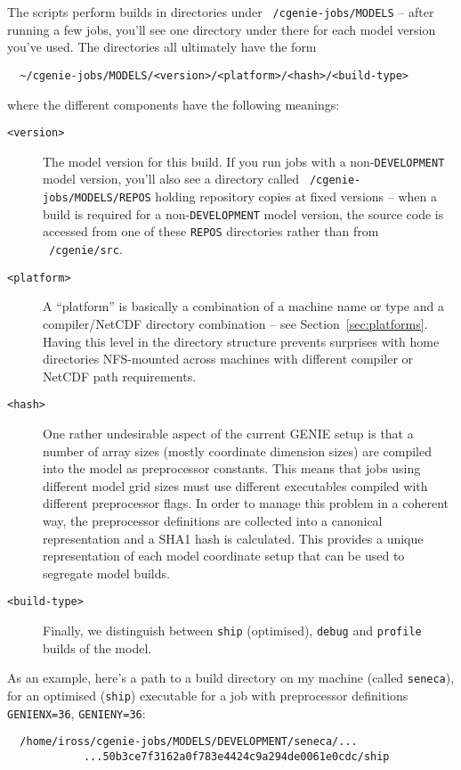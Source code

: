 \documentclass[a4paper,10pt,article]{memoir}
\begin{document}
The scripts perform builds in directories under
\texttt{~/cgenie-jobs/MODELS} -- after running a few jobs, you'll see
one directory under there for each model version you've used.  The
directories all ultimately have the form
\begin{verbatim}
  ~/cgenie-jobs/MODELS/<version>/<platform>/<hash>/<build-type>
\end{verbatim}
where the different components have the following meanings:
\begin{description}
  \item[\texttt{<version>}]{The model version for this build.  If you
    run jobs with a non-\texttt{DEVELOPMENT} model version, you'll
    also see a directory called \texttt{~/cgenie-jobs/MODELS/REPOS}
    holding repository copies at fixed versions -- when a build is
    required for a non-\texttt{DEVELOPMENT} model version, the source
    code is accessed from one of these \texttt{REPOS} directories
    rather than from \texttt{~/cgenie/src}.}
  \item[\texttt{<platform>}]{A ``platform'' is basically a combination
    of a machine name or type and a compiler/NetCDF directory
    combination -- see Section~\ref{sec:platforms}.  Having this level
    in the directory structure prevents surprises with home
    directories NFS-mounted across machines with different compiler or
    NetCDF path requirements.}
  \item[\texttt{<hash>}]{One rather undesirable aspect of the current
    GENIE setup is that a number of array sizes (mostly coordinate
    dimension sizes) are compiled into the model as preprocessor
    constants.  This means that jobs using different model grid sizes
    must use different executables compiled with different
    preprocessor flags.  In order to manage this problem in a coherent
    way, the preprocessor definitions are collected into a canonical
    representation and a SHA1 hash is calculated.  This provides a
    unique representation of each model coordinate setup that can be
    used to segregate model builds.}
  \item[\texttt{<build-type>}]{Finally, we distinguish between
    \texttt{ship} (optimised), \texttt{debug} and \texttt{profile}
    builds of the model.}
\end{description}
As an example, here's a path to a build directory on my machine
(called \texttt{seneca}), for an optimised (\texttt{ship}) executable
for a job with preprocessor definitions \texttt{GENIENX=36},
\texttt{GENIENY=36}:
\begin{verbatim}
  /home/iross/cgenie-jobs/MODELS/DEVELOPMENT/seneca/...
            ...50b3ce7f3162a0f783e4424c9a294de0061e0cdc/ship
\end{verbatim}
\end{document}
